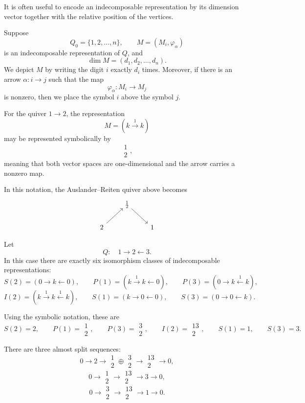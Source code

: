 \documentclass[11pt, a4paper]{report}
\begin{document}
It is often useful to encode an indecomposable representation by its dimension
vector together with the relative position of the vertices.

Suppose
\[
    Q_0=\{1,2,\dots,n\},
    \qquad
    M=(M_i,\varphi_\alpha)
\]
is an indecomposable representation of $Q$, and
\[
    \dim M=(d_1,d_2,\dots,d_n).
\]
We depict $M$ by writing the digit $i$ exactly $d_i$ times. Moreover, if there is
an arrow $\alpha:i\to j$ such that the map
\[
    \varphi_\alpha:M_i\to M_j
\]
is nonzero, then we place the symbol $i$ above the symbol $j$.

For the quiver $1\to 2$, the representation
\[
    M=\left(k \xrightarrow{1} k\right)
\]
may be represented symbolically by
\[
    \substack{1 \\ 2},
\]
meaning that both vector spaces are one-dimensional and the arrow carries a
nonzero map.

In this notation, the Auslander--Reiten quiver above becomes
\[
    \begin{tikzcd}
        & \substack{1 \\ 2} \arrow[rd] &   \\
        2 \arrow[ru] &                        & 1
    \end{tikzcd}
\]

Let
\[
    Q:\quad 1 \longrightarrow 2 \longleftarrow 3.
\]
In this case there are exactly six isomorphism classes of indecomposable
representations:
\[
    S(2)=
    \left(
    0 \longrightarrow k \longleftarrow 0
    \right),
    \qquad
    P(1)=
    \left(
    k \xrightarrow{1} k \longleftarrow 0
    \right),
    \qquad
    P(3)=
    \left(
    0 \longrightarrow k \xleftarrow{1} k
    \right),
\]
\[
    I(2)=
    \left(
    k \xrightarrow{1} k \xleftarrow{1} k
    \right),
    \qquad
    S(1)=
    \left(
    k \longrightarrow 0 \longleftarrow 0
    \right),
    \qquad
    S(3)=
    \left(
    0 \longrightarrow 0 \longleftarrow k
    \right).
\]

Using the symbolic notation, these are
\[
    S(2)=2,\qquad
    P(1)=\substack{1 \\ 2},\qquad
    P(3)=\substack{3 \\ 2},\qquad
    I(2)=\substack{13 \\ 2},\qquad
    S(1)=1,\qquad
    S(3)=3.
\]

There are three almost split sequences:
\[
    0 \longrightarrow 2
    \longrightarrow
    \substack{1 \\ 2}\oplus\substack{3 \\ 2}
    \longrightarrow
    \substack{13 \\ 2}
    \longrightarrow 0,
\]
\[
    0 \longrightarrow \substack{1 \\ 2}
    \longrightarrow
    \substack{13 \\ 2}
    \longrightarrow
    3
    \longrightarrow 0,
\]
\[
    0 \longrightarrow \substack{3 \\ 2}
    \longrightarrow
    \substack{13 \\ 2}
    \longrightarrow
    1
    \longrightarrow 0.
\]
\end{document}

